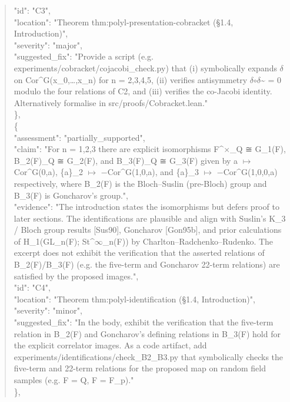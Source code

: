 \documentclass[11pt]{article}
\begin{document}
\begin{quote}
      "id": "C3",\\
      "location": "Theorem thm:polyl-presentation-cobracket (§1.4, Introduction)",\\
      "severity": "major",\\
      "suggested\_fix": "Provide a script (e.g. experiments/cobracket/cojacobi\_check.py) that (i) symbolically expands \ensuremath{\delta} on Cor\^{}G(x\_0,…,x\_n) for n = 2,3,4,5, (ii) verifies antisymmetry \ensuremath{\delta}\ensuremath{\circ}\ensuremath{\delta}\~{} = 0 modulo the four relations of C2, and (iii) verifies the co-Jacobi identity. Alternatively formalise in src/proofs/Cobracket.lean."\\
    \},\\
    \{\\
      "assessment": "partially\_supported",\\
      "claim": "For n = 1,2,3 there are explicit isomorphisms F\^{}\ensuremath{\times}\_Q ≅ G\_1(F), B\_2(F)\_Q ≅ G\_2(F), and B\_3(F)\_Q ≅ G\_3(F) given by a \ensuremath{\mapsto} Cor\^{}G(0,a), \{a\}\_2 \ensuremath{\mapsto} \ensuremath{-}Cor\^{}G(1,0,a), and \{a\}\_3 \ensuremath{\mapsto} \ensuremath{-}Cor\^{}G(1,0,0,a) respectively, where B\_2(F) is the Bloch--Suslin (pre-Bloch) group and B\_3(F) is Goncharov's group.",\\
      "evidence": "The introduction states the isomorphisms but defers proof to later sections. The identifications are plausible and align with Suslin's K\_3 / Bloch group results [Sus90], Goncharov [Gon95b], and prior calculations of H\_1(GL\_n(F); St\^{}\ensuremath{\infty}\_n(F)) by Charlton--Radchenko--Rudenko. The excerpt does not exhibit the verification that the asserted relations of B\_2(F)/B\_3(F) (e.g. the five-term and Goncharov 22-term relations) are satisfied by the proposed images.",\\
      "id": "C4",\\
      "location": "Theorem thm:polyl-identification (§1.4, Introduction)",\\
      "severity": "minor",\\
      "suggested\_fix": "In the body, exhibit the verification that the five-term relation in B\_2(F) and Goncharov's defining relations in B\_3(F) hold for the explicit correlator images. As a code artifact, add experiments/identifications/check\_B2\_B3.py that symbolically checks the five-term and 22-term relations for the proposed map on random field samples (e.g. F = Q, F = F\_p)."\\
    \},\\

\end{quote}
\end{document}

